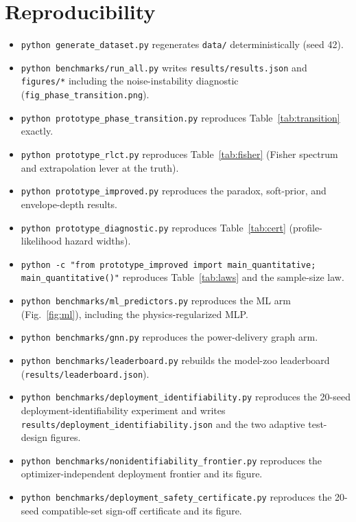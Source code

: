 \documentclass{article}
\begin{document}
\section*{Reproducibility}
\begin{itemize}
  \item \texttt{python generate\_dataset.py} regenerates \texttt{data/}
        deterministically (seed 42).
  \item \texttt{python benchmarks/run\_all.py} writes \texttt{results/results.json}
        and \texttt{figures/*} including the noise-instability diagnostic
        (\texttt{fig\_phase\_transition.png}).
  \item \texttt{python prototype\_phase\_transition.py} reproduces
        Table~\ref{tab:transition} exactly.
  \item \texttt{python prototype\_rlct.py} reproduces Table~\ref{tab:fisher}
        (Fisher spectrum and extrapolation lever at the truth).
  \item \texttt{python prototype\_improved.py} reproduces the paradox, soft-prior,
        and envelope-depth results.
  \item \texttt{python prototype\_diagnostic.py} reproduces
        Table~\ref{tab:cert} (profile-likelihood hazard widths).
  \item \texttt{python -c "from prototype\_improved import main\_quantitative; main\_quantitative()"}
        reproduces
        Table~\ref{tab:laws} and the sample-size law.
  \item \texttt{python benchmarks/ml\_predictors.py} reproduces the ML arm
        (Fig.~\ref{fig:ml}), including the physics-regularized MLP.
  \item \texttt{python benchmarks/gnn.py} reproduces the power-delivery graph
        arm.
  \item \texttt{python benchmarks/leaderboard.py} rebuilds the model-zoo
        leaderboard (\texttt{results/leaderboard.json}).
  \item \texttt{python benchmarks/deployment\_identifiability.py} reproduces
        the 20-seed deployment-identifiability experiment and writes
        \texttt{results/deployment\_identifiability.json} and the two adaptive
        test-design figures.
  \item \texttt{python benchmarks/nonidentifiability\_frontier.py} reproduces
        the optimizer-independent deployment frontier and its figure.
  \item \texttt{python benchmarks/deployment\_safety\_certificate.py} reproduces
        the 20-seed compatible-set sign-off certificate and its figure.
\end{itemize}
\end{document}
